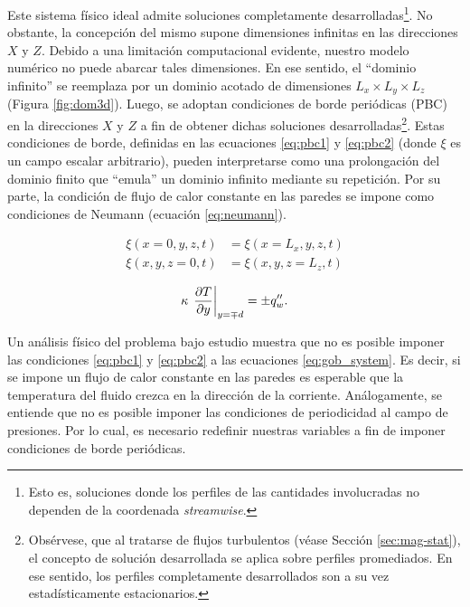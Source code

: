 Este sistema físico ideal admite soluciones completamente desarrolladas\footnote{Esto es, soluciones donde los perfiles de las cantidades involucradas no dependen de la coordenada \textit{streamwise}.}. No \linebreak obstante, la concepción del mismo supone dimensiones infinitas en las direcciones $X$ y $Z$. Debido a una limitación computacional evidente, nuestro modelo numérico no puede abarcar tales dimensiones. En ese sentido, el ``dominio infinito'' se reemplaza por un dominio acotado de dimensiones $L_x \times L_y \times L_z$ (Figura \ref{fig:dom3d}). Luego, se adoptan condiciones de borde periódicas (PBC) en la direcciones $X$ y $Z$ a fin de obtener dichas soluciones desarrolladas\footnote{Obsérvese, que al tratarse de flujos turbulentos (véase Sección \ref{sec:mag-stat}), el concepto de solución \linebreak desarrollada se aplica sobre perfiles promediados. En ese sentido, los perfiles completamente desarrollados son a su vez estadísticamente estacionarios.}. Estas condiciones de borde, definidas en las ecuaciones \ref{eq:pbc1} y \ref{eq:pbc2} (donde $\xi$ es un campo escalar arbitrario), pueden interpretarse como una prolongación del dominio finito que ``emula'' un dominio infinito mediante su repetición. Por su parte, la condición de flujo de calor constante en las paredes se impone como condiciones de Neumann (ecuación \ref{eq:neumann}).

\begin{align}
\xi(x=0,y,z,t) &= \xi(x=L_x,y,z,t)
\label{eq:pbc1} \\
\xi(x,y,z=0,t) &= \xi(x,y,z=L_z,t)
\label{eq:pbc2}
\end{align}

\begin{equation}
\kappa \hspace{0.5mm} \left. \frac{\partial T}{\partial y} \right\vert_{y=\mp d} = \pm q''_w \text{.}
\label{eq:neumann}
\end{equation}



Un análisis físico del problema bajo estudio muestra que no es posible imponer las condiciones \ref{eq:pbc1} y \ref{eq:pbc2} a las ecuaciones \ref{eq:gob_system}. Es decir, si se impone un flujo de calor constante en las paredes es esperable que la temperatura del fluido crezca en la dirección de la corriente. Análogamente, se entiende que no es posible imponer las condiciones de periodicidad al campo de presiones. Por lo cual, es necesario redefinir nuestras variables a fin de imponer condiciones de borde periódicas.

